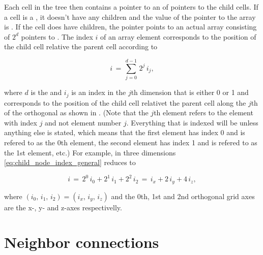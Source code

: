 Each cell in the tree then contains a pointer to an  of pointers to the child cells. If a cell is a , it doesn't have any children and the value of the pointer to the array is \NULL. If the cell does have children, the pointer points to an actual array consisting of $2^d$ pointers to . The index $i$ of an array element corresponds to the position of the child cell relative the parent cell according to

\begin{equation} \label{eq:child_node_index_general}
i \,=\, \sum_{j=0}^{d-1} \,2^j\,i_j,
\end{equation}

where $d$ is the \dimensionality and $i_j$ is an index in the $j$th dimension that is either 0 or 1 and corresponds to the position of the child cell relativet the parent cell along the $j$th of the orthogonal  as shown in . (Note that the $j$th element refers to the element with index $j$ and not element number $j$. Everything that is indexed will be  unless anything else is stated, which means that the first element has index 0 and is refered to as the 0th element, the second element has index 1 and is refered to as the 1st element, etc.) For example, in three dimensions \eqref{eq:child_node_index_general} reduces to

\begin{equation} \label{eq:child_node_index_three_dimensions}
i \,=\, 2^0\,i_0 + 2^1\,i_1 + 2^2\,i_2 \,=\, i_x + 2\,i_y + 4\,i_z,
\end{equation}

where $(i_0,\,i_1,\,i_2) = (i_x,\,i_y,\,i_z)$ and the 0th, 1st and 2nd orthogonal grid axes are the x-, y- and z-axes respectivelly.

\section{Neighbor connections}
